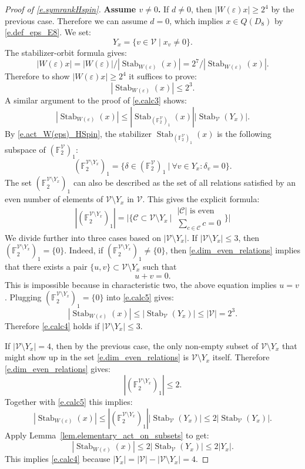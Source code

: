 \documentclass[12pt]{amsart}
\numberwithin{equation}{section}
\theoremstyle{definition}
\newcommand{\cC}{\mathcal{C}}
\newcommand{\cV}{\mathcal{V}}
\newcommand{\bF}{\mathbb{F}}
\newcommand{\Stab}{\operatorname{Stab}}
\newcommand{\eps}{\varepsilon}
\begin{document}
\begin{proof}[Proof of \eqref{e.symrankHspin}]
\smallskip
     \textbf{Assume $v\neq 0$.} If $d \neq 0$, then $|W(\eps) x|\geq 2^4$ by the previous case. Therefore we can assume $d =0$, which implies $x\in Q(D_8)$ by \eqref{e.def_eps_E8}. We set: $$Y_x = \{ v\in \cV \mid x_v \neq 0 \}.$$
        The stabilizer-orbit formula gives:
        $$|W(\eps)x| = |W(\eps)|/|\Stab_{W(\eps)}(x)| = 2^7/|\Stab_{W(\eps)}(x)|.$$
        Therefore to show $|W(\eps)x|\geq 2^4$ it suffices to prove:
        \begin{equation}\label{e.calc4}
            |\Stab_{W(\eps)}(x)| \leq 2^3.
        \end{equation}
        A similar argument to the proof of \eqref{e.calc3} shows:
        \begin{equation}\label{e.calc5}
             |\Stab_{W(\eps)}(x) | \leq |\Stab_{(\bF_2^\cV)_1}(x)| |\Stab_{\cV}(Y_x)|.
        \end{equation}
        By \eqref{e.act_W(eps)_HSpin}, the stabilizer $\Stab_{(\bF_2^{\cV})_1}(x)$ is the following subspace of $(\bF_2^{\cV})_1$:  
        $$(\bF_2^{\cV\setminus Y_x})_1 = \bigg\{ \delta\in (\bF_2^\cV)_1 \ {\Big|}\  \forall v\in Y_x: \delta_v = 0 \bigg\}.$$
        The set $(\bF_2^{\cV\setminus Y_x})_1$ can also be described as the set of all relations satisfied by an even number of elements of ${\cV\setminus Y_x}$ in $\cV$. This gives the explicit formula:
        \begin{equation}\label{e.dim_even_relations}
            | (\bF_2^{\cV\setminus Y_x})_1 |= \bigg | \bigg\{ \cC \subset \cV\setminus Y_x \ {\Big|}\   \begin{matrix}  |\cC| \text{ is even}\\
            \sum_{c\in \cC} c = 0
        \end{matrix} \bigg\} \bigg |
        \end{equation}
        We divide further into three cases based on $|\cV\setminus Y_x|$. If $|\cV\setminus Y_x|\leq 3$, then $(\bF_2^{\cV\setminus Y_x})_1= \{0 \}$. Indeed, if $(\bF_2^{\cV\setminus Y_x})_1 \neq \{0\}$, then \eqref{e.dim_even_relations} implies that there exists a pair $\{u,v\}\subset \cV\setminus Y_x$ such that
        $$ u + v = 0.$$
        This is impossible because in characteristic two, the above equation implies $u=v$. Plugging $(\bF_2^{\cV\setminus Y_x})_1= \{0 \}$ into \eqref{e.calc5} gives:
        $$|\Stab_{W(\eps)}(x) | \leq  |\Stab_{\cV}(Y_x)| \leq   |\cV| =  2^3.$$
        Therefore \eqref{e.calc4} holds if $|\cV\setminus Y_x|\leq 3$.

        \smallskip
        If $|\cV\setminus Y_x| =4$, then by the previous case, the only non-empty subset of $\cV\setminus Y_x$  that might show up in the set \eqref{e.dim_even_relations} is $\cV\setminus Y_x$ itself. Therefore \eqref{e.dim_even_relations} gives:
        $$ |(\bF_2^{\cV\setminus Y_x})_1| \leq 2.$$
        Together with \eqref{e.calc5} this implies:
        $$|\Stab_{W(\eps)}(x) | \leq |(\bF_2^{\cV\setminus Y_x})_1 | |\Stab_{\cV}(Y_x)| \leq  2|\Stab_{\cV}(Y_x)|.$$ 
        Apply Lemma~\ref{lem.elementary_act_on_subsets} to get:
        $$|\Stab_{W(\eps)}(x) | \leq  2|\Stab_{\cV}(Y_x)| \leq 2|Y_x|.$$
        This implies \eqref{e.calc4} because $|Y_x| = |\cV| - |\cV \setminus Y_x| =4$.


\end{proof}
\end{document}
